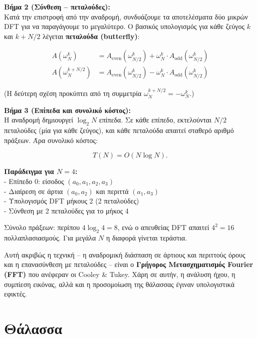 \documentclass[a4paper, 11pt]{article}
\begin{document}
\textbf{Βήμα 2 (Σύνθεση -- πεταλούδες):}\\
Κατά την επιστροφή από την αναδρομή, συνδυάζουμε τα αποτελέσματα δύο
μικρών DFT για να παραγάγουμε το μεγαλύτερο. Ο βασικός υπολογισμός για
κάθε ζεύγος \(k\) και \(k+N/2\) λέγεται \textbf{πεταλούδα (butterfly)}:

\[
\begin{aligned}
A(\omega_N^k) &= A_{\text{even}}(\omega_{N/2}^k) + \omega_N^k \cdot A_{\text{odd}}(\omega_{N/2}^k) \\
A(\omega_N^{k+N/2}) &= A_{\text{even}}(\omega_{N/2}^k) - \omega_N^k \cdot A_{\text{odd}}(\omega_{N/2}^k)
\end{aligned}
\]

(Η δεύτερη σχέση προκύπτει από τη συμμετρία
\(\omega_N^{k+N/2} = -\omega_N^k\).)

\textbf{Βήμα 3 (Επίπεδα και συνολικό κόστος):}\\
Η αναδρομή δημιουργεί \(\log_2 N\) επίπεδα. Σε κάθε επίπεδο, εκτελούνται
\(N/2\) πεταλούδες (μία για κάθε ζεύγος), και κάθε πεταλούδα απαιτεί
σταθερό αριθμό πράξεων. Άρα συνολικό κόστος:

\[
T(N) = O(N \log N).
\]

\textbf{Παράδειγμα για \(N=4\):}\\
- Επίπεδο 0: είσοδος \((a_0,a_1,a_2,a_3)\)\\
- Διαίρεση σε άρτια \((a_0,a_2)\) και περιττά \((a_1,a_3)\)\\
- Υπολογισμός DFT μήκους 2 (2 πεταλούδες)\\
- Σύνθεση με 2 πεταλούδες για το μήκος 4

Σύνολο πράξεων: περίπου \(4 \log_2 4 = 8\), ενώ ο απευθείας DFT απαιτεί
\(4^2=16\) πολλαπλασιασμούς. Για μεγάλα \(N\) η διαφορά γίνεται
τεράστια.

Αυτή ακριβώς η τεχνική -- η αναδρομική διάσπαση σε άρτιους και περιττούς
όρους και η επανασύνθεση με πεταλούδες -- είναι ο \textbf{Γρήγορος
Μετασχηματισμός Fourier (FFT)} που ανέφεραν οι Cooley \& Tukey. Χάρη σε
αυτήν, η ανάλυση ήχου, η συμπίεση εικόνας, αλλά και η προσομοίωση της
θάλασσας έγιναν υπολογιστικά εφικτές.

\section{Θάλασσα}\label{ux3b8ux3acux3bbux3b1ux3c3ux3c3ux3b1}
\end{document}
